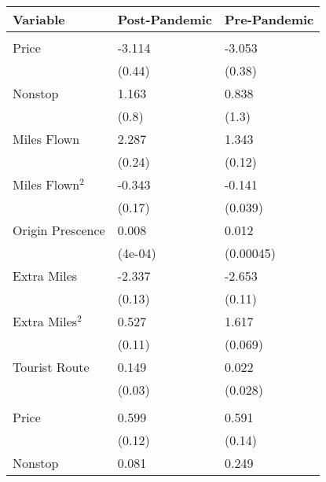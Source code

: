 
\begin{tabular}[t]{lll}
\toprule
Variable & Post-Pandemic & Pre-Pandemic\\
\midrule
\addlinespace[0.3em]
\multicolumn{3}{l}{\textbf{Linear Coefficients}}\\
\hspace{1em}Price & -3.114 & -3.053\\
\hspace{1em} & (0.44) & (0.38)\\
\hspace{1em}Nonstop & 1.163 & 0.838\\
\hspace{1em} & (0.8) & (1.3)\\
\hspace{1em}Miles Flown & 2.287 & 1.343\\
\hspace{1em} & (0.24) & (0.12)\\
\hspace{1em}Miles Flown$^2$ & -0.343 & -0.141\\
\hspace{1em} & (0.17) & (0.039)\\
\hspace{1em}Origin Prescence & 0.008 & 0.012\\
\hspace{1em} & (4e-04) & (0.00045)\\
\hspace{1em}Extra Miles & -2.337 & -2.653\\
\hspace{1em} & (0.13) & (0.11)\\
\hspace{1em}Extra Miles$^2$ & 0.527 & 1.617\\
\hspace{1em} & (0.11) & (0.069)\\
\hspace{1em}Tourist Route & 0.149 & 0.022\\
\hspace{1em} & (0.03) & (0.028)\\
\midrule
\addlinespace[0.3em]
\multicolumn{3}{l}{\textbf{Nonlinear Coefficient}}\\
\hspace{1em}Price & 0.599 & 0.591\\
\hspace{1em} & (0.12) & (0.14)\\
\hspace{1em}Nonstop & 0.081 & 0.249\\

\end{tabular}
